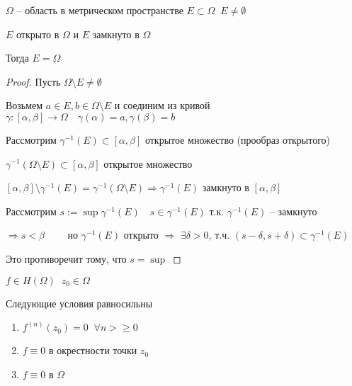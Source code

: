 
\begin{lemma}\thmslashn
	
	$\Omega$ -- область в метрическом пространстве $E \subset \Omega \;\; E \not = \emptyset$
	
	$E$ открыто в $\Omega$ и $E$ замкнуто в $\Omega$
	
	Тогда $E = \Omega$
	
\end{lemma}

\begin{proof}\thmslashn

	Пусть $\Omega \setminus E \not= \emptyset$
	
	Возьмем $a \in E, b\in \Omega \setminus E$ и соединим из кривой $\gamma:[\alpha, \beta] \to \Omega \quad \gamma(\alpha) = a, \gamma(\beta) = b$
	
	Рассмотрим $\gamma^{-1}(E) \subset [\alpha, \beta]$	открытое множество (прообраз открытого)
	
	$\gamma^{-1}(\Omega \setminus E) \subset [\alpha, \beta] $ открытое множество
	
	$[\alpha, \beta] \setminus \gamma^{-1}(E) = \gamma^{-1}(\Omega \setminus E) \Rightarrow \gamma^{-1}(E)$ замкнуто в $[\alpha, \beta]$
	
	Рассмотрим $s:= \sup \gamma^{-1}(E) \quad s \in \gamma^{-1}(E)$ т.к. $\gamma^{-1}(E)$ -- замкнуто
	
	$\Rightarrow s < \beta\qquad$ но $\gamma^{-1}(E)$ открыто $\Rightarrow$ $\exists \delta > 0$, т.ч. $(s-\delta, s+ \delta) \subset \gamma^{-1}(E)$
	
	Это противоречит тому, что $s = \sup$
	
\end{proof}

\begin{theorem}[единственности]\thmslashn
	
	$f\in H(\Omega) \;\;z_0 \in \Omega$
	
	Следующие условия равносильны 
	
	\begin{enumerate}[1)]
		\item 
		$f^{(n)}(z_0) = 0 \;\; \forall n >\geqslant 0$
		\item
		$f\equiv 0 $ в окрестности точки $z_0$
		\item
		$f \equiv 0$ в $\Omega$
	\end{enumerate}
	
\end{theorem}

